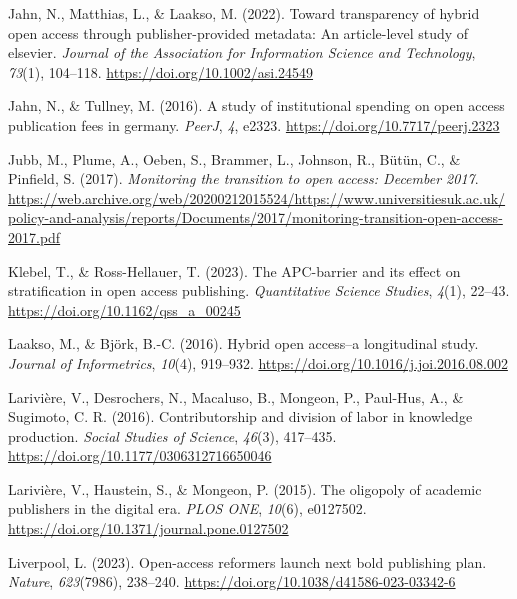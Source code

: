 \documentclass[a4paper,man,floatsintext,longtable,noextraspace,12pt]{apa6}
\newenvironment{CSLReferences}%
  {}%
  {\par}
\begin{document}
\begin{CSLReferences}{1}{0}
\leavevmode{}%
Jahn, N., Matthias, L., \& Laakso, M. (2022). Toward transparency of
hybrid open access through publisher-provided metadata: An article-level
study of elsevier. \emph{Journal of the Association for Information
Science and Technology}, \emph{73}(1), 104--118.
\url{https://doi.org/10.1002/asi.24549}

\leavevmode{}%
Jahn, N., \& Tullney, M. (2016). A study of institutional spending on
open access publication fees in germany. \emph{{PeerJ}}, \emph{4},
e2323. \url{https://doi.org/10.7717/peerj.2323}

\leavevmode{}%
Jubb, M., Plume, A., Oeben, S., Brammer, L., Johnson, R., Bütün, C., \&
Pinfield, S. (2017). \emph{Monitoring the transition to open access:
December 2017}.
\url{https://web.archive.org/web/20200212015524/https://www.universitiesuk.ac.uk/policy-and-analysis/reports/Documents/2017/monitoring-transition-open-access-2017.pdf}

\leavevmode{}%
Klebel, T., \& Ross-Hellauer, T. (2023). The APC-barrier and its effect
on stratification in open access publishing. \emph{Quantitative Science
Studies}, \emph{4}(1), 22--43. \url{https://doi.org/10.1162/qss_a_00245}

\leavevmode{}%
Laakso, M., \& Björk, B.-C. (2016). Hybrid open access--a longitudinal
study. \emph{Journal of Informetrics}, \emph{10}(4), 919--932.
\url{https://doi.org/10.1016/j.joi.2016.08.002}

\leavevmode{}%
Larivière, V., Desrochers, N., Macaluso, B., Mongeon, P., Paul-Hus, A.,
\& Sugimoto, C. R. (2016). Contributorship and division of labor in
knowledge production. \emph{Social Studies of Science}, \emph{46}(3),
417--435. \url{https://doi.org/10.1177/0306312716650046}

\leavevmode{}%
Larivière, V., Haustein, S., \& Mongeon, P. (2015). The oligopoly of
academic publishers in the digital era. \emph{{PLOS} {ONE}},
\emph{10}(6), e0127502.
\url{https://doi.org/10.1371/journal.pone.0127502}

\leavevmode{}%
Liverpool, L. (2023). Open-access reformers launch next bold publishing
plan. \emph{Nature}, \emph{623}(7986), 238--240.
\url{https://doi.org/10.1038/d41586-023-03342-6}


\end{CSLReferences}
\end{document}
